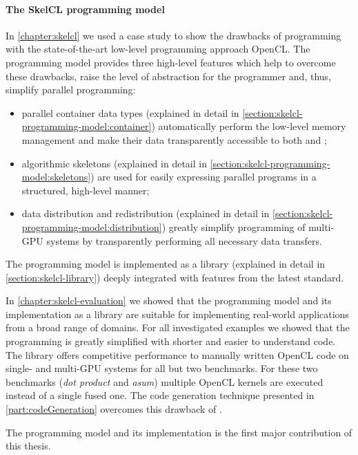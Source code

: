 \paragraph{The SkelCL programming model}
In \autoref{chapter:skelcl} we used a case study to show the drawbacks of programming with the state-of-the-art low-level programming approach OpenCL.
The \SkelCL programming model provides three high-level features which help to overcome these drawbacks, raise the level of abstraction for the programmer and, thus, simplify parallel programming:
\begin{itemize}
  \item parallel container data types (explained in detail in \autoref{section:skelcl-programming-model:container}) automatically perform the low-level memory management and make their data transparently accessible to both \CPU and \GPUs;
  \item algorithmic skeletons (explained in detail in \autoref{section:skelcl-programming-model:skeletons}) are used for easily expressing parallel programs in a structured, high-level manner;
  \item data distribution and redistribution (explained in detail in \autoref{section:skelcl-programming-model:distribution}) greatly simplify programming of multi-GPU systems by transparently performing all necessary data transfers.
\end{itemize}

\noindent
The \SkelCL programming model is implemented as a \Cpp library (explained in detail in \autoref{section:skelcl-library}) deeply integrated with features from the latest \Cpp standard.

In \autoref{chapter:skelcl-evaluation} we showed that the \SkelCL programming model and its implementation as a \Cpp library are suitable for implementing real-world applications from a broad range of domains.
For all investigated examples we showed that the programming is greatly simplified with shorter and easier to understand code.
The \SkelCL library offers competitive performance to manually written OpenCL code on single- and multi-GPU systems for all but two benchmarks.
For these two benchmarks (\emph{dot product} and \emph{asum}) multiple OpenCL kernels are executed instead of a single fused one.
The code generation technique presented in \autoref{part:codeGeneration} overcomes this drawback of \SkelCL.

\bigskip
The \SkelCL programming model and its implementation is the first major contribution of this thesis.

